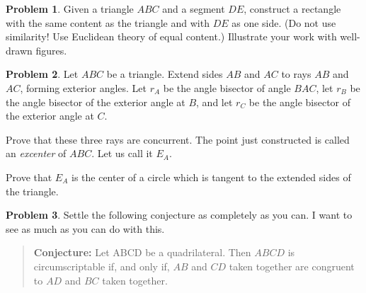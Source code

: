 \documentclass{tufte-handout}
\theoremstyle{definition}
\newtheorem{problem}{Problem}[section]
\begin{document}
\begin{problem} 
Given a triangle $ABC$ and a segment $DE$, construct a rectangle with the same content as the triangle and with $DE$ as one side. 
(Do not use similarity! Use Euclidean theory of equal content.) 
Illustrate your work with well-drawn figures.
\end{problem}

\begin{problem} 
Let $ABC$ be a triangle. 
Extend sides $AB$ and $AC$ to rays $AB$ and $AC$, forming exterior angles. 
Let $r_A$ be the angle bisector of angle $BAC$, let $r_B$ be the angle bisector of the exterior angle at $B$, and let $r_C$ be the angle bisector of the exterior angle at $C$.
\begin{compactitem}
\item Prove that these three rays are concurrent.
The point just constructed is called an \emph{excenter} of $ABC$. 
Let us call it $E_A$.
\item Prove that $E_A$ is the center of a circle which is tangent to the extended sides of the triangle.
\end{compactitem}
\end{problem}

\begin{problem} Settle the following conjecture as completely as you can. I want to see as much as you can do with this.
\begin{quotation}
\textbf{Conjecture:} 
Let ABCD be a quadrilateral. 
Then $ABCD$ is circumscriptable if, and only if, $AB$ and $CD$ taken together are congruent to $AD$ and $BC$ taken together.
\end{quotation}
\end{problem}

\vfill
\end{document}
